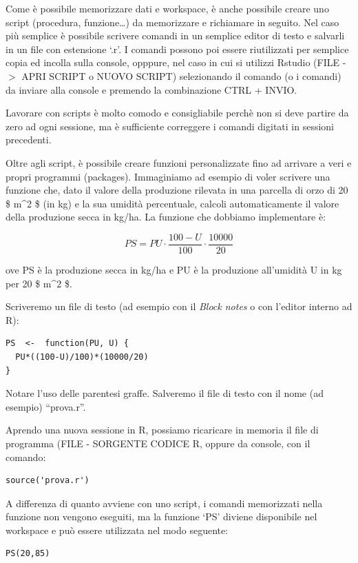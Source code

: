 \documentclass[a4paper,12pt,oneside]{book}
\begin{document}
Come è possibile memorizzare dati e workspace, è anche possibile creare
uno script (procedura, funzione\ldots{}) da memorizzare e richiamare in
seguito. Nel caso più semplice è possibile scrivere comandi in un
semplice editor di testo e salvarli in un file con estensione `.r'. I
comandi possono poi essere riutilizzati per semplice copia ed incolla
sulla console, opppure, nel caso in cui si utilizzi Rstudio (FILE -\(>\)
APRI SCRIPT o NUOVO SCRIPT) selezionando il comando (o i comandi) da
inviare alla console e premendo la combinazione CTRL + INVIO.

Lavorare con scripts è molto comodo e consigliabile perchè non si deve
partire da zero ad ogni sessione, ma è sufficiente correggere i comandi
digitati in sessioni precedenti.

Oltre agli script, è possibile creare funzioni personalizzate fino ad
arrivare a veri e propri programmi (packages). Immaginiamo ad esempio di
voler scrivere una funzione che, dato il valore della produzione
rilevata in una parcella di orzo di 20 \$ m\^{}2 \$ (in kg) e la sua
umidità percentuale, calcoli automaticamente il valore della produzione
secca in kg/ha. La funzione che dobbiamo implementare è:

\[
PS = PU \cdot \frac{100 - U}{100} \cdot \frac{10000}{20}
\]

ove PS è la produzione secca in kg/ha e PU è la produzione all'umidità U
in kg per 20 \$ m\^{}2 \$.

Scriveremo un file di testo (ad esempio con il \emph{Block notes} o con
l'editor interno ad R):

\begin{verbatim}
PS  <-  function(PU, U) {
  PU*((100-U)/100)*(10000/20)
}
\end{verbatim}

Notare l'uso delle parentesi graffe. Salveremo il file di testo con il
nome (ad esempio) ``prova.r''.

Aprendo una nuova sessione in R, possiamo ricaricare in memoria il file
di programma (FILE - SORGENTE CODICE R, oppure da console, con il
comando:

\begin{verbatim}
source('prova.r')
\end{verbatim}

A differenza di quanto avviene con uno script, i comandi memorizzati
nella funzione non vengono eseguiti, ma la funzione `PS' diviene
disponibile nel workspace e può essere utilizzata nel modo seguente:

\begin{verbatim}
PS(20,85)
\end{verbatim}
\end{document}
